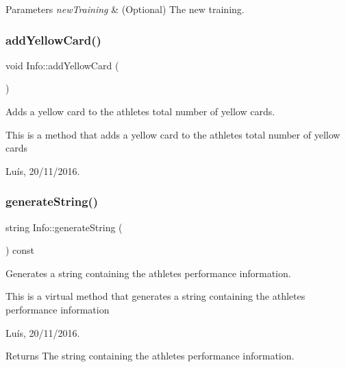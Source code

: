 \begin{DoxyParams}{Parameters}
{\em new\+Training} & (Optional) The new training. \\
\hline
\end{DoxyParams}
\hypertarget{class_info_a414d2bf966a75da821b708bec2ec612d}{}\label{class_info_a414d2bf966a75da821b708bec2ec612d} 
\subsubsection{\texorpdfstring{add\+Yellow\+Card()}{addYellowCard()}}
{\footnotesize\ttfamily void Info\+::add\+Yellow\+Card (\begin{DoxyParamCaption}{ }\end{DoxyParamCaption})}



Adds a yellow card to the athlete\textquotesingle{}s total number of yellow cards. 

This is a method that adds a yellow card to the athlete\textquotesingle{}s total number of yellow cards

Luís, 20/11/2016. \hypertarget{class_info_a5e52b35a9c17b58222bb57af16c16ce3}{}\label{class_info_a5e52b35a9c17b58222bb57af16c16ce3} 
\subsubsection{\texorpdfstring{generate\+String()}{generateString()}}
{\footnotesize\ttfamily string Info\+::generate\+String (\begin{DoxyParamCaption}{ }\end{DoxyParamCaption}) const\hspace{0.3cm}{\ttfamily [virtual]}}



Generates a string containing the athlete\textquotesingle{}s performance information. 

This is a virtual method that generates a string containing the athlete\textquotesingle{}s performance information

Luís, 20/11/2016. 

\begin{DoxyReturn}{Returns}
The string containing the athlete\textquotesingle{}s performance information. 
\end{DoxyReturn}


